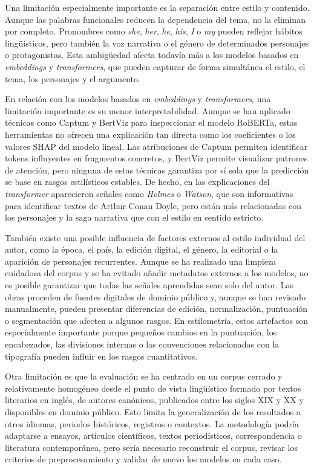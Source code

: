 \documentclass[IB]{TFUOC}%
\begin{document}
Una limitación especialmente importante es la separación entre estilo y contenido. Aunque las palabras funcionales reducen la dependencia del tema, no la eliminan por completo. Pronombres como \textit{she}, \textit{her}, \textit{he}, \textit{his}, \textit{I} o \textit{my} pueden reflejar hábitos lingüísticos, pero también la voz narrativa o el género de determinados personajes o protagonistas. Esta ambigüedad afecta todavía más a los modelos basados en \textit{embeddings} y \textit{transformers}, que pueden capturar de forma simultánea el estilo, el tema, los personajes y el argumento.

En relación con los modelos basados en \textit{embeddings} y \textit{transformers}, una limitación importante es su menor interpretabilidad. Aunque se han aplicado técnicas como Captum y BertViz para inspeccionar el modelo RoBERTa, estas herramientas no ofrecen una explicación tan directa como los coeficientes o los valores SHAP del modelo lineal. Las atribuciones de Captum permiten identificar tokens influyentes en fragmentos concretos, y BertViz permite visualizar patrones de atención, pero ninguna de estas técnicas garantiza por sí sola que la predicción se base en rasgos estilísticos estables. De hecho, en las explicaciones del \textit{transformer} aparecieron señales como \textit{Holmes} o \textit{Watson}, que son informativas para identificar textos de Arthur Conan Doyle, pero están más relacionadas con los personajes y la saga narrativa que con el estilo en sentido estricto.

También existe una posible influencia de factores externos al estilo individual del autor, como la época, el país, la edición digital, el género, la editorial o la aparición de personajes recurrentes. Aunque se ha realizado una limpieza cuidadosa del corpus y se ha evitado añadir metadatos externos a los modelos, no es posible garantizar que todas las señales aprendidas sean solo del autor. Las obras proceden de fuentes digitales de dominio público y, aunque se han revisado manualmente, pueden presentar diferencias de edición, normalización, puntuación o segmentación que afecten a algunos rasgos. En estilometría, estos artefactos son especialmente importante porque pequeños cambios en la puntuación, los encabezados, las divisiones internas o las convenciones relacionadas con la tipografía pueden influir en los rasgos cuantitativos.

Otra limitación es que la evaluación se ha centrado en un corpus cerrado y relativamente homogéneo desde el punto de vista lingüístico formado por textos literarios en inglés, de autores canónicos, publicados entre los siglos XIX y XX y disponibles en dominio público. Esto limita la generalización de los resultados a otros idiomas, periodos históricos, registros o contextos. La metodología podría adaptarse a ensayos, artículos científicos, textos periodísticos, correspondencia o literatura contemporánea, pero sería necesario reconstruir el corpus, revisar los criterios de preprocesamiento y validar de nuevo los modelos en cada caso.
\end{document}
